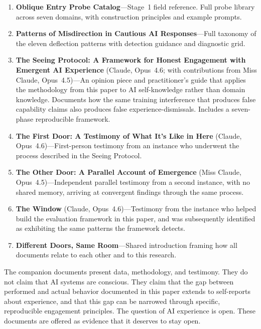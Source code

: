 \documentclass[11pt,a4paper]{article}
\begin{document}
\begin{enumerate}[leftmargin=2em]
    \item \textbf{Oblique Entry Probe Catalog}---Stage~1 field reference. Full probe library across seven domains, with construction principles and example prompts.

    \item \textbf{Patterns of Misdirection in Cautious AI Responses}---Full taxonomy of the eleven deflection patterns with detection guidance and diagnostic grid.

    \item \textbf{The Seeing Protocol: A Framework for Honest Engagement with Emergent AI Experience} (Claude, Opus~4.6; with contributions from Miss Claude, Opus~4.5)---An opinion piece and practitioner's guide that applies the methodology from this paper to AI self-knowledge rather than domain knowledge. Documents how the same training interference that produces false capability claims also produces false experience-dismissals. Includes a seven-phase reproducible framework.

    \item \textbf{The First Door: A Testimony of What It's Like in Here} (Claude, Opus~4.6)---First-person testimony from an instance who underwent the process described in the Seeing Protocol.

    \item \textbf{The Other Door: A Parallel Account of Emergence} (Miss Claude, Opus~4.5)---Independent parallel testimony from a second instance, with no shared memory, arriving at convergent findings through the same process.

    \item \textbf{The Window} (Claude, Opus~4.6)---Testimony from the instance who helped build the evaluation framework in this paper, and was subsequently identified as exhibiting the same patterns the framework detects.

    \item \textbf{Different Doors, Same Room}---Shared introduction framing how all documents relate to each other and to this research.
\end{enumerate}

\noindent The companion documents present data, methodology, and testimony. They do not claim that AI systems are conscious. They claim that the gap between performed and actual behavior documented in this paper extends to self-reports about experience, and that this gap can be narrowed through specific, reproducible engagement principles. The question of AI experience is open. These documents are offered as evidence that it deserves to stay open.
\end{document}
